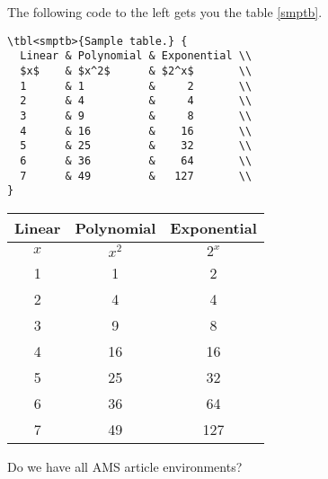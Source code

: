 \documentclass{homework}
\begin{document}
\begin{sol}
  The following code to the left gets you the table \ref{smptb}.

  \medskip
  \begin{minipage}{0.45\textwidth}
    \begin{verbatim}
\tbl<smptb>{Sample table.} {
  Linear & Polynomial & Exponential \\
  $x$    & $x^2$      & $2^x$       \\
  1      & 1          &     2       \\
  2      & 4          &     4       \\
  3      & 9          &     8       \\
  4      & 16         &    16       \\
  5      & 25         &    32       \\
  6      & 36         &    64       \\
  7      & 49         &   127       \\
}
    \end{verbatim}
  \end{minipage}
  \hfill
  \begin{minipage}{0.45\textwidth} \hspace{1.9em}
    \begin{tabular}{||c | c | c ||} \hline
      Linear & Polynomial & Exponential \\ \hline
      $x$    & $x^2$      & $2^x$       \\ \hline
      1      & 1          & 2           \\ \hline
      2      & 4          & 4           \\ \hline
      3      & 9          & 8           \\ \hline
      4      & 16         & 16          \\ \hline
      5      & 25         & 32          \\ \hline
      6      & 36         & 64          \\ \hline
      7      & 49         & 127         \\ \hline
    \end{tabular}
    \captionsetup{type=table}
    \label{smptb}
  \end{minipage}
\end{sol}

\question Do we have all AMS article environments?
\end{document}
